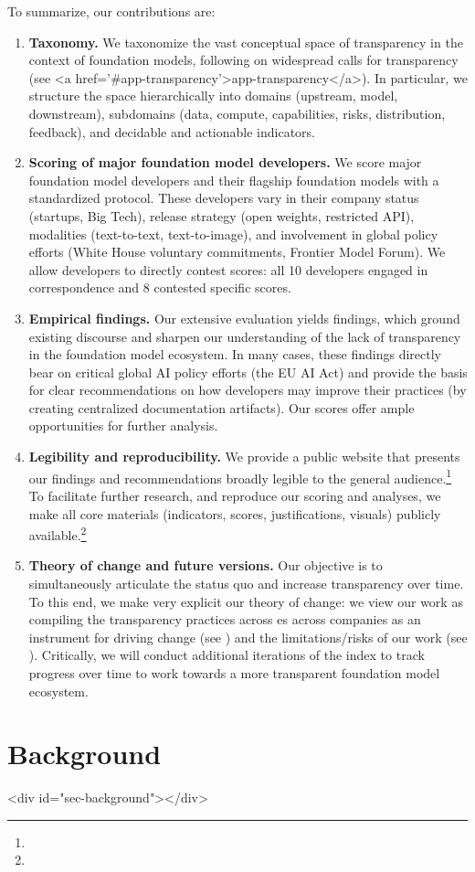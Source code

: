 \documentclass[screen, authorversion, acmsmall]{acmart}
\begin{document}
To summarize, our contributions are:
\begin{enumerate}
\item \textbf{Taxonomy.}
We taxonomize the vast conceptual space of transparency in the context of foundation models, following on widespread calls for transparency (see <a href='#app-transparency'>app-transparency</a>).
In particular, we structure the space hierarchically into \numdomains domains (\ie upstream, model, downstream), \numsubdomains subdomains (\eg data, compute, capabilities, risks, distribution, feedback), and \numindicators decidable and actionable indicators.
\item \textbf{Scoring of major foundation model developers.}
We score \numcompanies major foundation model developers and their flagship foundation models with a standardized protocol.
These developers vary in their company status (\eg startups, Big Tech), release strategy (\eg open weights, restricted API), modalities (\eg text-to-text, text-to-image), and involvement in global policy efforts (\eg White House voluntary commitments, Frontier Model Forum).
We allow developers to directly contest scores: all 10 developers engaged in correspondence and 8 contested specific scores.
\item \textbf{Empirical findings.}
Our extensive evaluation yields \numtotalfindings findings, which ground existing discourse and sharpen our understanding of the lack of transparency in the foundation model ecosystem.
In many cases, these findings directly bear on critical global AI policy efforts (\eg the EU AI Act) and provide the basis for clear recommendations on how developers may improve their practices (\eg by creating centralized documentation artifacts).
Our scores offer ample opportunities for further analysis. 
\item \textbf{Legibility and reproducibility.}
We provide a public website that presents our findings and recommendations broadly legible to the general audience.\footnote{\indexUrl}
To facilitate further research, and reproduce our scoring and analyses, we make all core materials (\eg indicators, scores, justifications, visuals) publicly available.\footnote{\materialsUrl}
\item \textbf{Theory of change and future versions.}
Our objective is to simultaneously articulate the status quo and increase transparency over time.
To this end, we make very explicit our theory of change: we view our work as compiling the transparency practices across es across companies as an instrument for driving change (see ) and the limitations/risks of our work (see ).
Critically, we will conduct additional iterations of the index to track progress over time to work towards a more transparent foundation model ecosystem.
\end{enumerate}
\clearpage
\hypertarget{background}{\section{Background}}
<div id="sec-background"></div>
\end{document}
